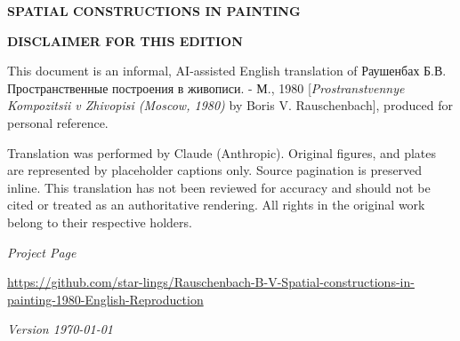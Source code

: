 
\thispagestyle{empty}
\vspace*{6em}
\begin{center}
  {\large\bfseries\MakeUppercase{Spatial Constructions in Painting}}
\end{center}
\clearpage

\thispagestyle{empty}
\vspace*{6em}
\begin{center}
  {\large\bfseries\MakeUppercase{Disclaimer for this edition}} \par \bigskip
This document is an informal, AI-assisted English translation of \textrussian{Раушенбах Б.В. Пространственные построения в живописи. - М., 1980} [\textit{Prostranstvennye Kompozitsii v Zhivopisi (Moscow, 1980)} by Boris V. Rauschenbach], produced for personal reference. \par \smallskip
Translation was performed by Claude (Anthropic). Original figures, and plates are represented by placeholder captions only. Source pagination is preserved inline. This translation has not been reviewed for accuracy and should not be cited or treated as an authoritative rendering. All rights in the original work belong to their respective holders. \par  \bigskip

\textit{Project Page} \par
\href{https://github.com/star-lings/Rauschenbach-B-V-Spatial-constructions-in-painting-1980-English-Reproduction}{https://github.com/star-lings/Rauschenbach-B-V-Spatial-constructions-in-painting-1980-English-Reproduction} \par

\vfill

\textit{Version \today}

\end{center}

\begin{center}
    
\end{center}
\clearpage

